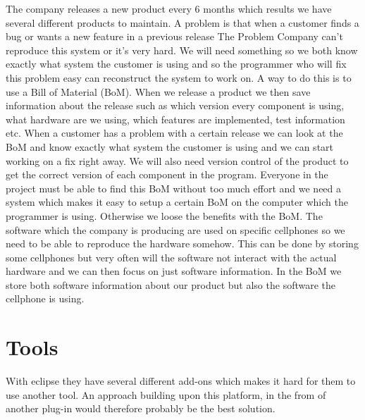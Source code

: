 \documentclass[a4paper,11pt]{article}
\begin{document}
The company releases a new product every 6 months which results we have several different products to maintain. A problem is that when a customer finds a bug or wants a new feature in a previous release The Problem Company can't reproduce this system or it's very hard. We will need something so we both know exactly what system the customer is using and so the programmer who will fix this problem easy can reconstruct the system to work on. A way to do this is to use a Bill of Material (BoM). When we release a product we then save information about the release such as which version every component is using, what hardware are we using, which features are implemented, test information etc.
When a customer has a problem with a certain release we can look at the BoM and know exactly what system the customer is using and we can start working on a fix right away.
We will also need version control of the product to get the correct version of each component in the program.
Everyone in the project must be able to find this BoM without too much effort and we need a system which makes it easy to setup a certain BoM on the computer which the programmer is using. Otherwise we loose the benefits with the BoM. The software which the company is producing are used on specific cellphones so we need to be able to reproduce the hardware somehow. This can be done by storing some cellphones but very often will the software not interact with the actual hardware and we can then focus on just software information. In the BoM we store both software information about our product but also the software the cellphone is using.


\section{Tools}
With eclipse they have several different add-ons which makes it hard for them to use another tool. An approach building upon this platform, in the from of another plug-in would therefore probably be the best solution.
\end{document}
